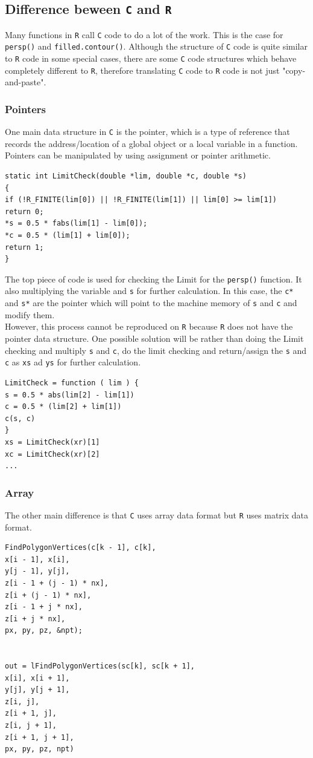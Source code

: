 \documentclass[paper=a4, fontsize=11pt]{report}
\begin{document}
\subsection{Difference beween \texttt{C} and \texttt{R}}
Many functions in \texttt{R} call \texttt{C} code to do a lot of the work.  This is the case for \texttt{persp()} and \texttt{filled.contour()}. Although the structure of \texttt{C} code is quite similar to \texttt{R} code in some special cases, there are some \texttt{C} code structures which behave completely different to \texttt{R}, therefore translating \texttt{C} code to \texttt{R} code is not just "copy-and-paste".\\

\subsubsection{Pointers}
One main data structure in \texttt{C} is the pointer, which is a type of reference that records the address/location of a global object or a local variable in a function. Pointers can be manipulated by using assignment or pointer arithmetic.
\begin{lstlisting}
static int LimitCheck(double *lim, double *c, double *s)
{
if (!R_FINITE(lim[0]) || !R_FINITE(lim[1]) || lim[0] >= lim[1])
return 0;
*s = 0.5 * fabs(lim[1] - lim[0]);
*c = 0.5 * (lim[1] + lim[0]);
return 1;
}
\end{lstlisting}

The top piece of code is used for checking the Limit for the \texttt{persp()} function. It also multiplying the variable  and \texttt{s} for further calculation. In this case, the \texttt{c*} and \texttt{s*} are the pointer which will point to the machine memory of \texttt{s} and \texttt{c} and modify them.\\

However, this process cannot be reproduced on \texttt{R} because \texttt{R} does not have the pointer data structure. One possible solution will be rather than doing the Limit checking and multiply \texttt{s} and \texttt{c}, do the limit checking and return/assign the \texttt{s} and \texttt{c} as \texttt{xs} ad \texttt{ys} for further calculation.
\begin{lstlisting}
LimitCheck = function ( lim ) {
s = 0.5 * abs(lim[2] - lim[1])
c = 0.5 * (lim[2] + lim[1])
c(s, c)
}
xs = LimitCheck(xr)[1]
xc = LimitCheck(xr)[2]
...
\end{lstlisting}
\subsubsection{Array}
The other main difference is that \texttt{C} uses array data format but \texttt{R} uses matrix data format. 
\begin{lstlisting}
FindPolygonVertices(c[k - 1], c[k],
x[i - 1], x[i],
y[j - 1], y[j],
z[i - 1 + (j - 1) * nx],
z[i + (j - 1) * nx],
z[i - 1 + j * nx],
z[i + j * nx],
px, py, pz, &npt);


out = lFindPolygonVertices(sc[k], sc[k + 1],
x[i], x[i + 1],
y[j], y[j + 1],
z[i, j],
z[i + 1, j],
z[i, j + 1],
z[i + 1, j + 1],
px, py, pz, npt)
\end{lstlisting}
\end{document}
